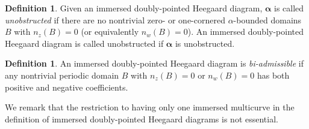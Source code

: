 \documentclass{amsart}
\theoremstyle{definition}
\newtheorem{defn}[thm]{Definition}
\theoremstyle{remark}
\numberwithin{equation}{section}
\numberwithin{equation}{section} \makeatletter
\begin{document}
\begin{defn}\label{Definition, unobstructedness for doubly-pointed diagram}
Given an immersed doubly-pointed Heegaard diagram, $\bm{\alpha}$ is called \emph{unobstructed} if there are no nontrivial zero- or one-cornered $\alpha$-bounded domains $B$ with $n_z(B)=0$ (or equivalently $n_w(B)=0$). An immersed doubly-pointed Heegaard diagram is called unobstructed if $\bm{\alpha}$ is unobstructed. 
\end{defn}
\begin{defn}\label{Definition, admissibility for doubly-pointed diagram}
An immersed doubly-pointed Heegaard diagram is \emph{bi-admissible} if any nontrivial periodic domain $B$ with $n_z(B)=0$ or $n_w(B)=0$ has both positive and negative coefficients.
\end{defn}

We remark that the restriction to having only one immersed multicurve in the definition of immersed doubly-pointed Heegaard diagrams is not essential. 
\end{document}
